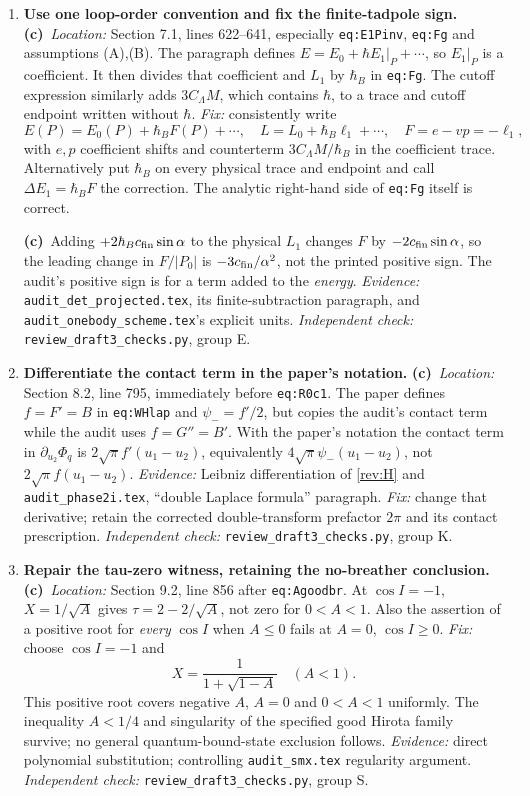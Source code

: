 \documentclass[11pt,a4paper]{article}
\newcommand{\C}{\textbf{(c)}\ }
\newcommand{\file}[1]{\nolinkurl{#1}}
\newcommand{\test}[1]{\textit{Independent check:} \file{review_draft3_checks.py}, group #1.}
\begin{document}
\begin{enumerate}[label=\textbf{R\arabic*.},leftmargin=*,itemsep=1.2em]
\item \textbf{Use one loop-order convention and fix the finite-tadpole sign.}
\C \textit{Location:} Section 7.1, lines 622--641, especially
\file{eq:E1Pinv}, \file{eq:Fg} and assumptions (A),(B).
The paragraph defines $E=E_0+\hbar E_1|_P+\cdots$, so $E_1|_P$ is a
coefficient. It then divides that coefficient and $L_1$ by $\hbar_B$ in
\file{eq:Fg}. The cutoff expression similarly adds $3C_\Lambda M$, which
contains $\hbar$, to a trace and cutoff endpoint written without $\hbar$.
\textit{Fix:} consistently write
\[
 E(P)=E_0(P)+\hbar_B F(P)+\cdots,\quad
 L=L_0+\hbar_B\ell_1+\cdots,\quad F=e-vp=-\ell_1,
\]
with $e,p$ coefficient shifts and counterterm $3C_\Lambda M/\hbar_B$ in
the coefficient trace. Alternatively put $\hbar_B$ on every physical
trace and endpoint and call $\Delta E_1=\hbar_BF$ the correction.
The analytic right-hand side of \file{eq:Fg} itself is correct.

\C Adding $+2\hbar_Bc_{\rm fin}\sin\alpha$ to the physical $L_1$ changes
$F$ by $-2c_{\rm fin}\sin\alpha$, so the leading change in $F/|P_0|$ is
$-3c_{\rm fin}/\alpha^2$, not the printed positive sign.
The audit's positive sign is for a term added to the \emph{energy}.
\textit{Evidence:} \file{audit_det_projected.tex}, its finite-subtraction
paragraph, and \file{audit_onebody_scheme.tex}'s explicit units. \test{E}

\item \textbf{Differentiate the contact term in the paper's notation.}
\C \textit{Location:} Section 8.2, line 795, immediately before
\file{eq:R0c1}. The paper defines $f=F'=B$ in \file{eq:WHlap} and
$\psi_-=f'/2$, but copies the audit's contact term while the audit uses
$f=G''=B'$. With the paper's notation the contact term in
$\partial_{u_2}\Phi_q$ is $2\sqrt\pi f'(u_1-u_2)$, equivalently
$4\sqrt\pi\psi_-(u_1-u_2)$, not $2\sqrt\pi f(u_1-u_2)$.
\textit{Evidence:} Leibniz differentiation of \eqref{rev:H} and
\file{audit_phase2i.tex}, ``double Laplace formula'' paragraph.
\textit{Fix:} change that derivative; retain the corrected double-transform
prefactor $2\pi$ and its contact prescription. \test{K}

\item \textbf{Repair the tau-zero witness, retaining the no-breather conclusion.}
\C \textit{Location:} Section 9.2, line 856 after \file{eq:Agoodbr}.
At $\cos I=-1$, $X=1/\sqrt A$ gives
$\tau=2-2/\sqrt A$, not zero for $0<A<1$.
Also the assertion of a positive root for \emph{every} $\cos I$ when
$A\le0$ fails at $A=0$, $\cos I\ge0$.
\textit{Fix:} choose $\cos I=-1$ and
\[
 X=\frac1{1+\sqrt{1-A}}\quad(A<1).
\]
This positive root covers negative $A$, $A=0$ and $0<A<1$ uniformly.
The inequality $A<1/4$ and singularity of the specified good Hirota family
survive; no general quantum-bound-state exclusion follows.
\textit{Evidence:} direct polynomial substitution; controlling
\file{audit_smx.tex} regularity argument. \test{S}


\end{enumerate}
\end{document}
